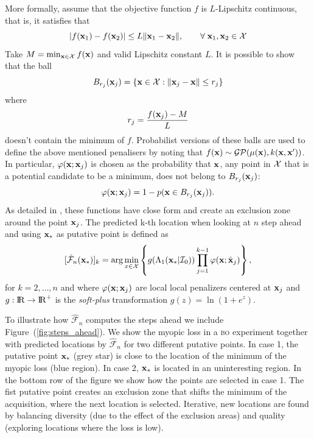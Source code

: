\documentclass[twoside]{article}
\def\bbbr{{\rm I\!R}}
\newcommand{\I}{\mathcal{I}}
\newcommand{\GP}{\mathcal{GP}}
\newcommand{\future}{\mathcal{F}}
\newcommand{\acr}[1]{\textsc{#1}\xspace}
\newcommand{\bo}{\acr{bo}}
\begin{document}
More formally, assume that the objective function $f$ is $L$-Lipschitz continuous, that is, it satisfies that
\begin{equation}\label{eq:lipschitz}
|f(\mathbf{x}_1) - f(\mathbf{x}_2) | \leq L \|\mathbf{x}_1 -\mathbf{x}_2 \|,\qquad\forall\; \mathbf{x}_1,\mathbf{x}_2\in\mathcal{X}
\end{equation} 
Take $M = \min_{\mathbf{x} \in {\mathcal{X}}} f(\mathbf{x})$ and valid Lipschitz constant $L$. It is possible to show that  the ball
\begin{equation}\label{eq:radious}
B_{r_j}(\mathbf{x}_j)= \{\mathbf{x}\in \mathcal{X} : \|\mathbf{x}_j-\mathbf{x} \| \leq r_j \}
\end{equation}
where
$$r_j = \frac{f(\mathbf{x}_j)-M}{L}$$
doesn't contain the minimum of $f$. Probabilist versions of these balls are used to define the above mentioned penalisers by noting that $\latentForce(\latentVector) \sim \GP(\mu(\latentVector),k(\latentVector,\latentVector'))$. In particular, $\varphi(\mathbf{x};\mathbf{x}_j)$ is chosen as the probability that $\mathbf{x}$, any point in $\mathcal{X}$ that is a potential candidate to be a minimum, does not belong to $B_{r_j}(\mathbf{x}_j)$:
\begin{equation}\label{eq:penalizer}
\varphi(\mathbf{x};\mathbf{x}_j)  = 1- p (\mathbf{x}  \in B_{r_j}(\mathbf{x}_j) ).
\end{equation}
As detailed in \cite{gonzalez2015batch}, these functions have close form and create an exclusion zone around the point $\mathbf{x}_j$. The predicted k-th location when looking at $n$ step ahead and using $\mathbf{x}_*$ as putative point is defined as
\begin{equation}\label{eq:penalized_acquisition}
 [\hat{\future}_n(\latentVector_*)]_k  =\arg \min_{x \in \inputSpace} \left\{g(\Lambda_1(\latentVector_*| \I_0))\prod_{j=1}^{k-1}\varphi(\latentVector;\hat{\latentVector}_{j})\right\},
\end{equation}
for $k=2,\dots,n$ and where $\varphi(\mathbf{x};\mathbf{x}_{j})$ are local local penalizers centered at $\mathbf{x}_{j}$ and $g:\bbbr \rightarrow \bbbr^+$ is the \emph{soft-plus} transformation $g(z)= \ln(1+e^z)$.

To illustrate how $\hat{\future}_n$ computes the steps ahead we include Figure~(\ref{fig:steps_ahead}). We show the myopic loss in a \bo experiment together with predicted locations by $\hat{\future}_n$ for two different putative points. In case 1, the putative point $\mathbf{x}_*$ (grey star) is close to the location of the minimum of the myopic loss (blue region). In case 2, $\mathbf{x}_*$ is located in an uninteresting region. In the bottom row of the figure we show how the points are selected in case 1. The fist putative point creates an exclusion zone that shifts the minimum of the acquisition, where the next location is selected. Iterative, new locations are found by balancing diversity (due to the effect of the exclusion areas) and quality (exploring locations where the loss is low). 
 
\end{document}
